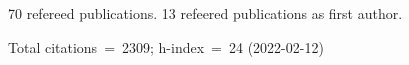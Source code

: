 70 refereed publications. 13 refeered publications as first author.

Total citations~=~2309; h-index~=~24 (2022-02-12)